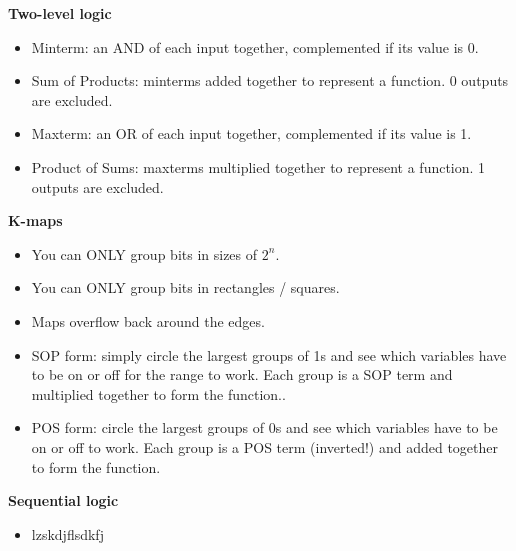 \documentclass{article}
\begin{document}
\textbf{Two-level logic}
\begin{itemize}
    \item Minterm: an AND of each input together, complemented if its value is 0.
    \item Sum of Products: minterms added together to represent a function. 0 outputs are excluded.
    \item Maxterm: an OR of each input together, complemented if its value is 1.
    \item Product of Sums: maxterms multiplied together to represent a function. 1 outputs are excluded.
\end{itemize}
\textbf{K-maps}
\begin{itemize}
    \item You can ONLY group bits in sizes of $2^n$.
    \item You can ONLY group bits in rectangles / squares.
    \item Maps overflow back around the edges.
    \item SOP form: simply circle the largest groups of 1s and see which variables have to be on or off for the range to work. Each group is a SOP term and multiplied together to form the function..
    \item POS form: circle the largest groups of 0s and see which variables have to be on or off to work. Each group is a POS term (inverted!) and added together to form the function.
\end{itemize}
\textbf{Sequential logic}
\begin{itemize}
    \item lzskdjflsdkfj
\end{itemize}
\end{document}

